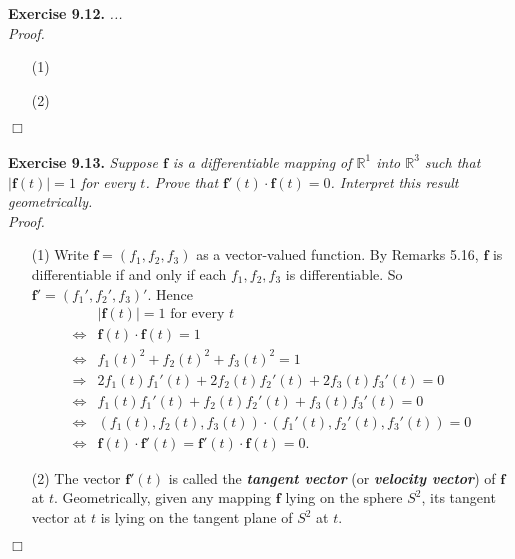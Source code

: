 \documentclass{article}
\begin{document}



\textbf{Exercise 9.12.}
\emph{...} \\

\emph{Proof.}
\begin{enumerate}
\item[(1)]
\item[(2)]

\end{enumerate}
$\Box$ \\\\






\textbf{Exercise 9.13.}
\emph{Suppose $\mathbf{f}$ is a differentiable mapping of $\mathbb{R}^1$ into
$\mathbb{R}^3$ such that $|\mathbf{f}(t)| = 1$ for every $t$.
Prove that $\mathbf{f}'(t) \cdot \mathbf{f}(t) = 0$.
Interpret this result geometrically.} \\

\emph{Proof.}
\begin{enumerate}
\item[(1)]
  Write $\mathbf{f} = (f_1, f_2, f_3)$ as a vector-valued function.
  By Remarks 5.16, $\mathbf{f}$ is differentiable if and only if each $f_1, f_2, f_3$
  is differentiable. So $\mathbf{f}' = (f_1', f_2', f_3)'$.
  Hence
  \begin{align*}
    &\text{$|\mathbf{f}(t)| = 1$ for every $t$} \\
    \Longleftrightarrow&
    \mathbf{f}(t) \cdot \mathbf{f}(t) = 1 \\
    \Longleftrightarrow&
    f_1(t)^2 + f_2(t)^2 + f_3(t)^2 = 1 \\
    \Longrightarrow&
    2 f_1(t) f_1'(t) + 2 f_2(t) f_2'(t) + 2 f_3(t) f_3'(t) = 0 \\
    \Longleftrightarrow&
    f_1(t) f_1'(t) + f_2(t) f_2'(t) + f_3(t) f_3'(t) = 0 \\
    \Longleftrightarrow&
    (f_1(t), f_2(t), f_3(t)) \cdot (f_1'(t), f_2'(t), f_3'(t)) = 0 \\
    \Longleftrightarrow&
    \mathbf{f}(t) \cdot \mathbf{f}'(t) = \mathbf{f}'(t) \cdot \mathbf{f}(t) = 0.
  \end{align*}

\item[(2)]
  The vector $\mathbf{f}'(t)$ is called the
  \emph{\textbf{tangent vector}} (or \emph{\textbf{velocity vector}})
  of $\mathbf{f}$ at $t$.
  Geometrically,
  given any mapping $\mathbf{f}$ lying on the sphere $S^2$,
  its tangent vector at $t$ is lying on the tangent plane of $S^2$ at $t$.
\end{enumerate}
$\Box$ \\\\
\end{document}
